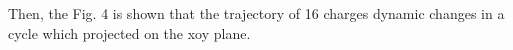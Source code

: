\documentclass[journal,twocolumn,letterpaper]{IEEEJERM}
\begin{document}
Then, the Fig. 4 is shown that the trajectory of 16 charges dynamic changes in a cycle which projected on the xoy plane. 
\begin{figure}[H]   
	\centering	  
	    \label{4a}  
	\label{4b}
	\label{4c}
	\label{4d}\\
	\label{4e}

\end{figure}
\end{document}
